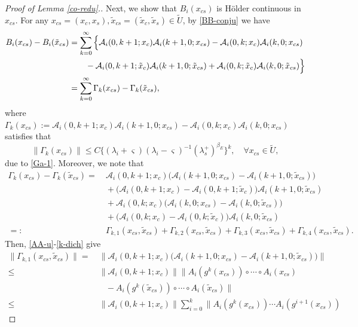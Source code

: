 \documentclass[reqno]{amsart}
\numberwithin{equation}{section}
\begin{document}
\begin{proof}[Proof of Lemma {\rm \ref{co-redu}}.]
Next, we show that $B_i(x_{cs})$ is  H\"{o}lder continuous in $x_{cs}$.
For any $x_{cs}=(x_c,x_s),\tilde{x}_{cs}=(\tilde x_c,\tilde x_s)\in \tilde{U}$, by \eqref{BB-conju} we have
\begin{align*}
B_i(x_{cs})-B_i(\tilde{x}_{cs})
& = \sum_{k=0}^\infty \Big\{ \mathcal{A}_i(0,k+1;x_c)
\mathcal{A}_i(k+1,0;x_{cs})-
\mathcal{A}_i(0,k;x_c)\mathcal{A}_i(k,0;x_{cs})
\notag \\
&\qquad -\mathcal{A}_i (0,k+1;\tilde{x}_c)\mathcal{A}_i(k+1,0;\tilde{x}_{cs})
+\mathcal{A}_i(0,k;\tilde{x}_c)
\mathcal{A}_i(k,0;\tilde{x}_{cs})  \Big\}
\notag \\
& = \sum_{k=0}^\infty  \Gamma_k(x_{cs}) -\Gamma_k(\tilde{x}_{cs}),
\end{align*}
where
$
\Gamma_k(x_{cs}):=\mathcal{A}_i(0,k+1;x_c) \mathcal{A}_i(k+1,0;x_{cs})
- \mathcal{A}_i(0,k;x_c) \mathcal{A}_i(k,0;x_{cs})
$
satisfies that
$$
\|\Gamma_k(x_{cs})\| \le C \{(\lambda_i+\varsigma)(\lambda_i-\varsigma)^{-1}(\lambda_s^+ )^{\beta_E}\}^k,\quad \forall x_{cs}\in \tilde U,
$$
due to \eqref{Ga-1}. Moreover, we note that
\begin{align*}
 \Gamma_k(x_{cs})-\Gamma_k(\tilde{x}_{cs})
=&~ \mathcal{A}_i(0,k+1;x_c)
   \big( \mathcal{A}_i(k+1,0;x_{cs})-\mathcal{A}_i(k+1,0;\tilde{x}_{cs})\big)
\\
&~+ \big( \mathcal{A}_i(0,k+1;x_c)-\mathcal{A}_i(0,k+1;\tilde{x}_c)\big) \mathcal{A}_i(k+1,0;\tilde{x}_{cs})
\\
&~+ \mathcal{A}_i(0,k;x_c)
   \big( \mathcal{A}_i(k,0;x_{cs})-\mathcal{A}_i(k,0;\tilde{x}_{cs})\big)
\\
&~+ \big( \mathcal{A}_i(0,k;x_c)-\mathcal{A}_i(0,k;\tilde{x}_c)\big) \mathcal{A}_i(k,0;\tilde{x}_{cs})
\\
=:&~ \Gamma_{k,1}(x_{cs},\tilde{x}_{cs}) + \Gamma_{k,2}(x_{cs},\tilde{x}_{cs}) + \Gamma_{k,3}(x_{cs},\tilde{x}_{cs}) + \Gamma_{k,4}(x_{cs},\tilde{x}_{cs}).
\end{align*}
Then, \eqref{AA-u}-\eqref{k-dich} give
\begin{align*}
 \|\Gamma_{k,1}(x_{cs},\tilde{x}_{cs})\|
=&~ \|\mathcal{A}_i(0,k+1;x_c)
   \big( \mathcal{A}_i(k+1,0;x_{cs})-\mathcal{A}_i(k+1,0;\tilde{x}_{cs})\big)\|
\\
 \le&~  \|\mathcal{A}_i(0,k+1;x_c)\|
\|A_i(g^k(x_{cs}))\circ \cdots \circ A_i(x_{cs})
\\
&\quad- A_i(g^k(\tilde{x}_{cs}))\circ \cdots \circ A_i(\tilde{x}_{cs}) \|
\\
 \le &~ \|\mathcal{A}_i(0,k+1;x_c)\| \sum_{i=0}^k
\|A_i(g^k(x_{cs})) \cdots  A_i(g^{i+1}(x_{cs}))

\end{align*}
\end{proof}
\end{document}
